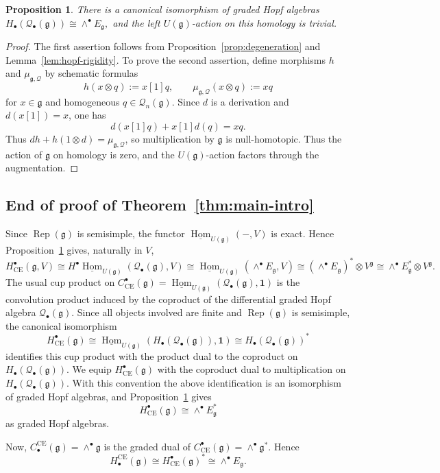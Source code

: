 \documentclass[12pt]{amsart}
\newtheorem{proposition}[theorem]{Proposition}
\theoremstyle{remark}
\DeclareMathOperator{\Rep}{Rep}
\DeclareMathOperator{\Hom}{Hom}
\newcommand{\g}{\mathfrak g}
\newcommand{\one}{\mathbf 1}
\newcommand{\CE}{\mathrm{CE}}
\newcommand{\uHom}{\underline{\Hom}}
\newcommand{\cQ}{\mathcal Q}
\begin{document}
\begin{proposition}\label{prop:Q-homology}
There is a canonical isomorphism of graded Hopf algebras
$
 H_\bullet(\cQ_\bullet(\g))\cong\wedge^\bullet E_\g,
$
and the left $U(\g)$-action on this homology is trivial.
\end{proposition}

\begin{proof}
The first assertion follows from Proposition~\ref{prop:degeneration} and
Lemma~\ref{lem:hopf-rigidity}. To prove the second assertion,  
define morphisms $h$ and $\mu_{\g,\cQ}$ by schematic formulas
\[
 h(x\otimes q):=x[1]q,
 \qquad \mu_{\g,\cQ}(x\otimes q):=xq
\]
for $x\in\g$ and homogeneous $q\in\cQ_n(\g)$.
Since $d$ is a derivation and $d(x[1])=x$, one has
\[
 d(x[1]q)+x[1]d(q)=xq.
\]
Thus $dh+h(1\otimes d)=\mu_{\g,\cQ}$, so multiplication by 
$\g$ is null-homotopic.
 Thus the action of $\g$ on homology is zero, and the $U(\g)$-action factors
through the augmentation.
\end{proof}

\subsection{End of proof of Theorem~\ref{thm:main-intro}}

Since $\Rep(\g)$ is semisimple, the functor $\uHom_{U(\g)}(-,V)$ is exact. 
Hence Proposition~\ref{prop:Q-homology} gives, naturally in $V$,
$$
 H^\bullet_{\CE}(\g,V)\cong
H^\bullet\uHom_{U(\g)}(\cQ_\bullet(\g),V)\cong 
\uHom_{U(\g)}(\wedge^\bullet E_\g,V)\cong(\wedge^\bullet E_\g)^*\otimes V^\g
 \cong\wedge^\bullet E_\g^*\otimes V^\g.
$$
The usual cup product on
$C^\bullet_{\CE}(\g)
 =\uHom_{U(\g)}(\cQ_\bullet(\g),\one)$
is the convolution product induced by the coproduct of the differential graded
Hopf algebra $\cQ_\bullet(\g)$.  Since all objects involved are finite and
$\Rep(\g)$ is semisimple, the canonical isomorphism
\[
 H^\bullet_{\CE}(\g)
 \cong \uHom_{U(\g)}(H_\bullet(\cQ_\bullet(\g)),\one)
 \cong H_\bullet(\cQ_\bullet(\g))^*
\]
identifies this cup product with the product dual to the coproduct on
$H_\bullet(\cQ_\bullet(\g))$.  We equip $H^\bullet_{\CE}(\g)$ with the
coproduct dual to multiplication on $H_\bullet(\cQ_\bullet(\g))$.  With this
convention the above identification is an isomorphism of graded Hopf algebras,
and Proposition~\ref{prop:Q-homology} gives
\[
 H^\bullet_{\CE}(\g)\cong\wedge^\bullet E_\g^*
\]
as graded Hopf algebras. 

Now, $C_\bullet^{\CE}(\g)=\wedge^\bullet\g$ is the
graded dual of $C^\bullet_{\CE}(\g)=\wedge^\bullet\g^*$.  Hence
\[
 H_\bullet^{\CE}(\g)\cong H^\bullet_{\CE}(\g)^*
 \cong\wedge^\bullet E_\g.
\]
\end{document}
